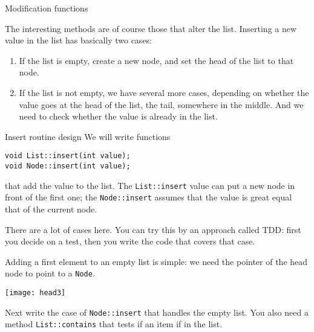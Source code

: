  {Modification functions}

The interesting methods are of course those that alter the
list. Inserting a new value in the list has basically two cases:
\begin{enumerate}
\item If the list is empty, create a new node, and set the head of the
  list to that node.
\item If the list is not empty, we have several more cases, depending
  on whether the value goes at the head of the list, the tail,
  somewhere in the middle. And we need to check whether the value is
  already in the list.
\end{enumerate}

\begin{block}{Insert routine design}
  \label{sl:linklist-insert-proto}
  We will write functions
\begin{lstlisting}
void List::insert(int value);
void Node::insert(int value);
\end{lstlisting}
that add the value to the list.
The \lstinline{List::insert} value can put a new node in front of the first one;
the \lstinline{Node::insert} assumes that the value is great equal that of the current node.
\end{block}

There are a lot of cases here. You can try this by an approach called
\acf{TDD}: first you decide on a test, then you write the code that
covers that case.






Adding a first element to an empty list is simple:
we need the pointer of the head node
to point to a \lstinline{Node}.

\texttt{[image: head3]}

\begin{exercise}
  \label{ex:listlist-insert-empty}
  Next write the case of \lstinline{Node::insert} that handles the empty
  list. You also need a method \lstinline{List::contains} that tests if an
  item if in the list.
\end{exercise}

